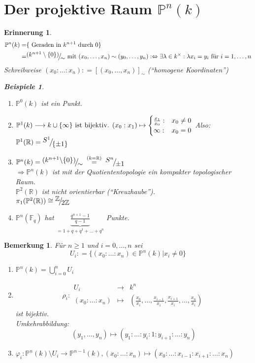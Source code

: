 \documentclass[a4paper,12pt]{report}
\theoremstyle{break}
\newtheorem{Bem}[Def]{Bemerkung}
\theoremstyle{nonumberbreak}
\newtheorem{nnBsp}{Beispiele}
\newtheorem{Eri}{Erinnerung}
\theoremstyle{nonumberplain}
\newcommand{\defeqr}[0]{\mathrel{\mathop:}=}
\newcommand{\gleichwegen}[1]{\ensuremath{\DOTSB\;\stackrel{#1}{=}\;}}
\newcommand{\Abb}[5]{\ensuremath{#1:\begin{array}{ccc} #2 & \longrightarrow & #3 \\ #4 & \longmapsto & #5 \end{array}}}
\newcommand{\FakRaum}[2]{
  \raisebox{0.7ex}{\ensuremath{#1}}
  \ensuremath{\mkern-3mu}\big/\ensuremath{\mkern-3mu}
  \raisebox{-0.6ex}{\ensuremath{#2}}}
\begin{document}
\section{Der projektive Raum $\mathbb P^n(k)$}
\begin{Eri}
  \begin{align*}
  \mathbb P^n(k)=& \{ \text{ Geraden in $k^{n+1}$ durch $0$} \}     \\
 =&\FakRaum{(k^{n+1}\setminus\{0\})}{\sim}\text{ mit }(x_0,\dots,x_n)\sim(y_0,\dots,y_n):\Leftrightarrow\exists\lambda\in k^\times:\lambda x_i=y_i\text{ für } i=1,\dots,n
  \end{align*}
Schreibweise $(x_0:\dots:x_n)\defeqr [(x_0,\dots,x_n)]_\sim$ (``homogene Koordinaten'')
\begin{nnBsp}
  \begin{enumerate}
  \item[$n=0$:] $\mathbb P^0(k)$ ist ein Punkt.
  \item[$n=1$:]
 $\mathbb P^1(k)\longrightarrow  k \cup \{ \infty \} \text{ ist bijektiv. } \\
(x_0:x_1) \mapsto  
\begin{cases}
  \frac{x_1}{x_0}:&x_0\neq 0 \\
\infty:&x_0=0
\end{cases} $
Also: $\mathbb P^1(\mathbb R)=\FakRaum{S^1}{\{ \pm 1\} }$
\item [$k\in\{\mathbb R, \mathbb C\}:$] $\mathbb P^n(k)=\FakRaum{(k^{n+1}\backslash \{0\})}{\sim}\gleichwegen{(k=\mathbb R)}\FakRaum{S^n}{\pm 1}$ \\
$\Rightarrow\mathbb P^n(k)$ ist mit der Quotiententopologie ein kompakter topologischer Raum. \\
$\mathbb P^2(\mathbb R)$ ist nicht orientierbar (``Kreuzhaube''). \\
$\pi_1(\mathbb P^2(\mathbb R))\cong \FakRaum{\mathbb Z}{2\mathbb Z}$ 
\item[$k=\mathbb F_q$:] $\mathbb P^n(\mathbb F_q)$ hat $\underbrace{\frac{q^{n+1}-1}{q-1}}_{=1+q+q^1+\dots+q^n}$ Punkte.
  \end{enumerate}
\end{nnBsp}
\end{Eri}
\begin{Bem}
  Für $n\geq 1$ und $i=0,\dots,n$ sei 
\[
U_i\defeqr\{(x_0:\dots:x_n)\in\mathbb P^n(k)\vert x_i\neq 0 \}
\]
\begin{enumerate}
\item $\mathbb P^n(k)=\bigcup_{i=0}^n U_i$
\item \[
\Abb{\rho_i}{U_i}{k^n}{(x_0:\dots:x_n)}{(\frac{x_0}{x_i},\dots,\frac{x_{i-1}}{x_i},\frac{x_{i+1}}{x_i},\dots,\frac{x_n}{x_i})}
\]
ist bijektiv. \\ Umkehrabbildung: 
\[ 
(y_1,\dots,y_n)\mapsto (y_1:\dots:y_i:1:y_{i+1}:\dots:y_n)
\]

\item $\varphi_i:\mathbb P^n(k)\setminus U_i\longrightarrow \mathbb P^{n-1}(k),(x_0:\dots:x_n)\mapsto(x_0:\dots:x_{i-1}:x_{i+1}:\dots:x_n)$
\end{enumerate}
\end{Bem}
\end{document}
